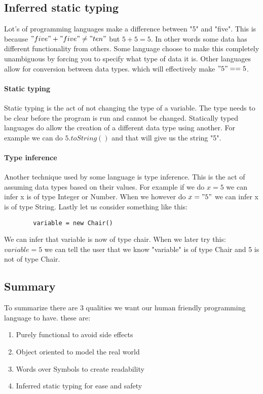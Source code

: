 \documentclass{scrartcl}
\begin{document}
    \subsection{Inferred static typing}
    Lot's of programming languages make a difference between "5" and "five".
    This is because $"five" + "five" \neq "ten"$ but $5 + 5 = 5$. In other
    words some data has different functionality from others. Some language choose
    to make this completely unambiguous by forcing you to specify what type
    of data it is. Other languages allow for conversion between data types.
    which will effectively make $"5" == 5$. 

    \paragraph{Static typing}
    Static typing is the act of not changing the type of a variable. The type
    needs to be clear before the program is run and cannot be changed. Statically
    typed languages do allow the creation of a different data type using another.
    For example we can do $5.toString()$ and that will give us the string "5".

    \paragraph{Type inference}
    Another technique used by some language is type inference. This is the act
    of assuming data types based on their values. For example if we do $x = 5$
    we can infer x is of type Integer or Number. When we however do $x = "5"$
    we can infer x is of type String. Lastly let us consider something like this:
    \begin{lstlisting}
        variable = new Chair()
    \end{lstlisting}
    We can infer that variable is now of type chair. When we later try this:
    $variable = 5$ we can tell the user that we know "variable" is of type Chair
    and 5 is not of type Chair.

    \subsection{Summary}
    To summarize there are 3 qualities we want our human friendly programming
    language to have. these are:
    \begin{enumerate}
        \item Purely functional to avoid side effects
        \item Object oriented to model the real world
        \item Words over Symbols to create readability
        \item Inferred static typing for ease and safety
    \end{enumerate}
\end{document}
